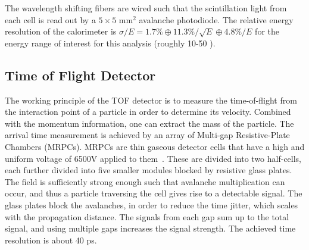 The wavelength shifting fibers are wired such that the scintillation light from each cell is read out by a $5\times5$ mm$^2$ avalanche photodiode. The relative energy resolution of the calorimeter is $\sigma/E = 1.7\% \oplus 11.3\%/\sqrt{E} \oplus 4.8\%/E$ for the energy range of interest for this analysis (roughly 10-50 \GeVc).


\subsection{Time of Flight Detector}
\label{sec:TOF}
The working principle of the TOF detector is to measure the time-of-flight from the interaction point of a particle in order to determine its velocity. Combined with the momentum information, one can extract the mass of the particle. The arrival time measurement is achieved by an array of Multi-gap Resistive-Plate Chambers (MRPCs). MRPCs are thin gaseous detector cells that have a high and uniform voltage of 6500V applied to them~\cite{Carnesecchi2019,Aamodt:2008zz}. These are divided into two half-cells, each further divided into five smaller modules blocked by resistive glass plates. The field is sufficiently strong enough such that avalanche multiplication can occur, and thus a particle traversing the cell gives rise to a detectable signal. The glass plates block the avalanches, in order to reduce the time jitter, which scales with the propagation distance. The signals from each gap sum up to the total signal, and using multiple gaps increases the signal strength. The achieved time resolution is about 40 ps.

